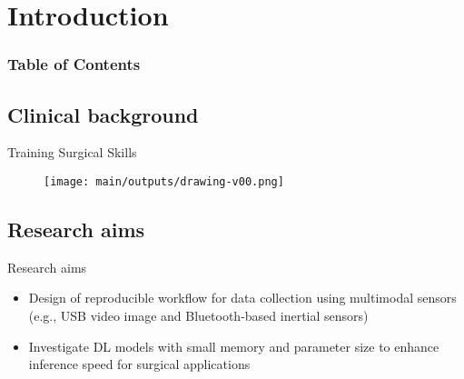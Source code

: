 
\section{Introduction}

\begin{frame}
  \frametitle{Table of Contents}
  \tableofcontents[currentsection]
\end{frame}



\subsection{Clinical background}

{

\begin{frame}{Training Surgical Skills}
      \begin{figure}
        \centering
        \texttt{[image: main/outputs/drawing-v00.png]}
      \end{figure}
\end{frame}
}


\subsection{Research aims}
{
\begin{frame}{Research aims}
\begin{itemize}
\item Design of reproducible workflow for data collection using multimodal sensors (e.g., USB video image and Bluetooth-based inertial sensors)
\item Investigate DL models with small memory and parameter size to enhance inference speed for surgical applications
\end{itemize}

\end{frame}
}

